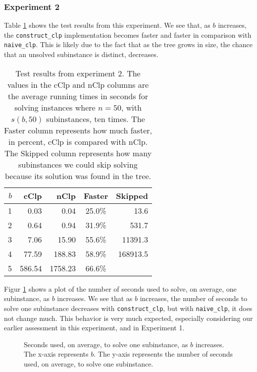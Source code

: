 \subsubsection{Experiment 2}
Table \ref{table:exptwo} shows the test results from this experiment. We see
that, as $b$ increases, the \texttt{construct\_clp} implementation becomes
faster and faster in comparison with \texttt{naive\_clp}.
This is likely due to the fact that as the tree grows in size, the chance that
an unsolved subinstance is distinct, decreases.
\begin{table}[ht!]
\centering
\caption{Test results from experiment 2. The values in the cClp and nClp
         columns are the average running times in seconds for solving
         instances where $n = 50$, with $s(b, 50)$ subinstances, ten times.
         The Faster column represents how much faster, in percent, cClp is
         compared with nClp. The Skipped column represents how many
         subinstances we could skip solving because its solution was found
         in the tree.
         }
\begin{tabular}{rrrcr}
      $b$ & cClp & nClp & Faster & Skipped\\ \hline
       1  & 0.03 & 0.04 & 25.0\% & 13.6 \\
       2  & 0.64 & 0.94 & 31.9\% & 531.7 \\
       3  & 7.06 & 15.90 & 55.6\% & 11391.3 \\
       4  & 77.59 & 188.83 & 58.9\% & 168913.5 \\
       5  & 586.54 & 1758.23 & 66.6\% 
\end{tabular}
\label{table:exptwo}
\end{table}

Figur \ref{fig:constructincb} shows a plot of the number of seconds used to
solve, on average, one subinstance, as $b$ increases.
We see that as $b$ increases, the number of
seconds to solve one subinstance decreases with \texttt{construct\_clp},
but with \texttt{naive\_clp}, it does not change much. This behavior is very
much expected, especially considering our earlier assessment in this
experiment, and in Experiment 1.

\begin{figure}[ht!]
    \centering
    
    \caption{Seconds used, on average, to solve one subinstance, as $b$
             increases.
             The x-axis represents $b$.
             The y-axis represents the number of seconds used, on average,
             to solve one subinstance.}
    \label{fig:constructincb}
\end{figure}

